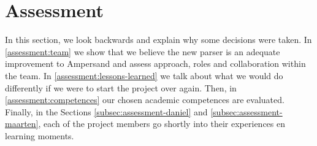 
\clearpage
\section{Assessment}
\label{sec:assessment}
In this section, we look backwards and explain why some decisions were taken.
In \autoref{assessment:team} we show that we believe the new parser is an adequate improvement to Ampersand and assess approach, roles and collaboration within the team.
In \autoref{assessment:lessons-learned} we talk about what we would do differently if we were to start the project over again.
Then, in \autoref{assessment:competences} our chosen academic competences are evaluated.
Finally, in the Sections \ref{subsec:assessment-daniel} and \ref{subsec:assessment-maarten}, each of the project members go shortly into their experiences en learning moments.






